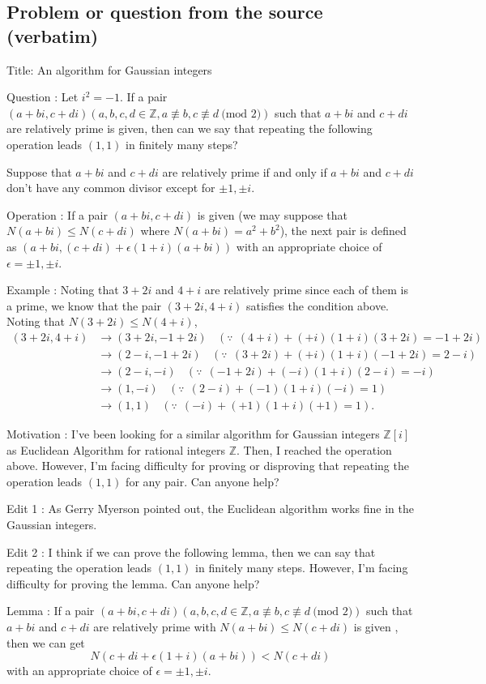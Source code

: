 \documentclass[11pt]{article}
\begin{document}
\subsection*{Problem or question from the source (verbatim)}
\begin{Vsrc}
Title: An algorithm for Gaussian integers

Question : Let $i^2=-1$. If a pair $(a+bi, c+di) (a,b,c,d\in\mathbb Z, a\not\equiv b, c\not\equiv d\ \text{(mod 2)})$ such that $a+bi$ and $c+di$ are relatively prime is given, then can we say that repeating the following operation leads $(1,1)$ in finitely many steps? 

  
  Suppose that $a+bi$ and $c+di$ are relatively prime if and only if $a+bi$ and $c+di$ don't have any common divisor except for $\pm 1,\pm i$.

  
  Operation : If a pair $(a+bi, c+di)$ is given (we may suppose that $N(a+bi)\le N(c+di)$ where $N(a+bi)=a^2+b^2$), the next pair is defined as $(a+bi, (c+di)+\epsilon (1+i)(a+bi))$ with an appropriate choice of $\epsilon=\pm 1,\pm i$.

Example : Noting that $3+2i$ and $4+i$ are relatively prime since each of them is a prime, we know that the pair $(3+2i,4+i)$ satisfies the condition above. Noting that $N(3+2i)\le N(4+i)$, 
$$\begin{align}
(3+2i,4+i) & \rightarrow (3+2i,-1+2i)\ \ \ \ (\because \ \ (4+i)+(+i)(1+i)(3+2i)=-1+2i)\\
 & \rightarrow (2-i, -1+2i)\ \ \ \  (\because \ \ (3+2i)+(+i)(1+i)(-1+2i)=2-i)\\ 
 & \rightarrow (2-i,-i)\ \ \ \  (\because \ \ (-1+2i)+(-i)(1+i)(2-i)=-i)\\
 & \rightarrow (1,-i)\ \ \ \  (\because \ \ (2-i)+(-1)(1+i)(-i)=1)\\ 
 & \rightarrow (1,1)\ \ \ \ (\because \ \ (-i)+(+1)(1+i)(+1)=1).
\end{align}$$

Motivation : I've been looking for a similar algorithm for Gaussian integers $\mathbb Z[i]$  as Euclidean Algorithm for rational integers $\mathbb Z$. Then, I reached the operation above. However, I'm facing difficulty for proving or disproving that repeating the operation leads $(1,1)$ for any pair. Can anyone help?

Edit 1 : As Gerry Myerson pointed out, the Euclidean algorithm works fine in the Gaussian integers. 

Edit 2 : I think if we can prove the following lemma, then we can say that repeating the operation leads $(1,1)$ in finitely many steps. However, I'm facing difficulty for proving the lemma. Can anyone help?

Lemma : If a pair $(a+bi, c+di) (a,b,c,d\in\mathbb Z, a\not\equiv b, c\not\equiv d\ \text{(mod 2)})$ such that $a+bi$ and $c+di$ are relatively prime with $N(a+bi)\le N(c+di)$ is given , then we can get 
$$N(c+di+\epsilon (1+i)(a+bi))\lt N(c+di)$$
with an appropriate choice of $\epsilon=\pm 1,\pm i$.
\end{Vsrc}
\end{document}
